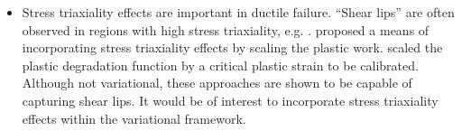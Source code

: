 \begin{itemize}
  \item Stress triaxiality effects are important in ductile failure. ``Shear lips'' are often observed in regions with high stress triaxiality, e.g. . \citet{borden2016phase} proposed a means of incorporating stress triaxiality effects by scaling the plastic work. \citet{ambati_phase-field_2015,ambati2016phase} scaled the plastic degradation function by a critical plastic strain to be calibrated. Although not variational, these approaches are shown to be capable of capturing shear lips. It would be of interest to incorporate stress triaxiality effects within the variational framework.
\end{itemize}
